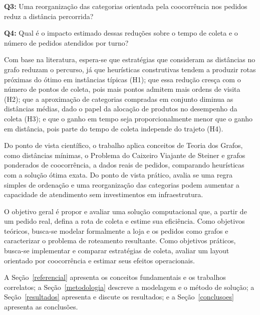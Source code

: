 \noindent\textbf{Q3:} Uma reorganização das categorias orientada pela coocorrência nos pedidos reduz a distância percorrida?

\noindent\textbf{Q4:} Qual é o impacto estimado dessas reduções sobre o tempo de coleta e o número de pedidos atendidos por turno?

Com base na literatura, espera-se que estratégias que consideram as distâncias no grafo reduzam o percurso, já que heurísticas construtivas tendem a produzir rotas próximas do ótimo em instâncias típicas \citep{johnson1997} (H1); que essa redução cresça com o número de pontos de coleta, pois mais pontos admitem mais ordens de visita (H2); que a aproximação de categorias compradas em conjunto diminua as distâncias médias, dado o papel da alocação de produtos no desempenho da coleta \citep{dekoster2007} (H3); e que o ganho em tempo seja proporcionalmente menor que o ganho em distância, pois parte do tempo de coleta independe do trajeto (H4).

Do ponto de vista científico, o trabalho aplica conceitos de Teoria dos Grafos, como distâncias mínimas, o Problema do Caixeiro Viajante de Steiner e grafos ponderados de coocorrência, a dados reais de pedidos, comparando heurísticas com a solução ótima exata. Do ponto de vista prático, avalia se uma regra simples de ordenação e uma reorganização das categorias podem aumentar a capacidade de atendimento sem investimentos em infraestrutura.

O objetivo geral é propor e avaliar uma solução computacional que, a partir de um pedido real, defina a rota de coleta e estime sua eficiência. Como objetivos teóricos, busca-se modelar formalmente a loja e os pedidos como grafos e caracterizar o problema de roteamento resultante. Como objetivos práticos, busca-se implementar e comparar estratégias de coleta, avaliar um layout orientado por coocorrência e estimar seus efeitos operacionais.

A Seção~\ref{referencial} apresenta os conceitos fundamentais e os trabalhos correlatos; a Seção~\ref{metodologia} descreve a modelagem e o método de solução; a Seção~\ref{resultados} apresenta e discute os resultados; e a Seção~\ref{conclusoes} apresenta as conclusões.
